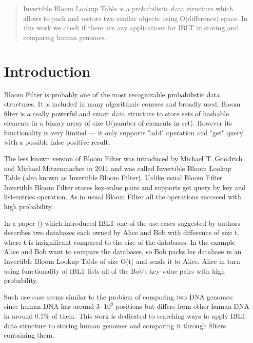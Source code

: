 \documentclass{article}
\begin{document}
\makeTitlePage

\begin{abstract}
    Invertible Bloom Lookup Table is a probabilistic data structure which
    allows to pack and restore two similar objects using O(difference) space. In
    this work we check if there are any applications for IBLT in storing and 
    comparing human genomes.
\end{abstract}
\tableofcontents


\section{Introduction}

Bloom Filter is probably one of the most recognizable probabilistic data
structures. It is included in many algorithmic courses and broadly used.
Bloom filter is a really powerful and smart data structure to store sets 
of hashable elements in a binary array of size O(number of elements in set).
However its functionality is very limited --- it only supports "add" operation
and "get" query with a possible false positive result.%

The less known version of Bloom Filter was introduced by Michael T. Goodrich 
and Michael Mitzenmacher in 2011 and was called Invertible Bloom Lookup 
Table (also known as Invertible Bloom Filter). Unlike usual Bloom Filter 
Invertible Bloom Filter stores key-value pairs and supports get query by 
key and list-entries operation. As in usual Bloom Filter all the operations 
succseed with high probability.


In a paper (\textcite{GoMi2011}) which introduced IBLT one of the use cases suggested by authors 
describes two databases each owned by Alice and Bob with difference of size 
t, where t is insignificant compared to the size of the databases. In the 
example Alice and Bob want to compare the databases, so Bob packs his 
database in an Invertible Bloom Lookup Table of size O(t) and sends it to 
Alice. Alice in turn using functionality of IBLT lists all of the Bob's 
key-value pairs with high probability.


Such use case seems similar to the problem of comparing two DNA genomes: 
since human DNA has around $3 \cdot 10^{9}$ positions but differs from other 
human DNA in around $0.1\%$ of them. This work is dedicated to 
searching ways to apply IBLT data structure to storing human genomes and 
comparing it through filters containing them.
\end{document}
